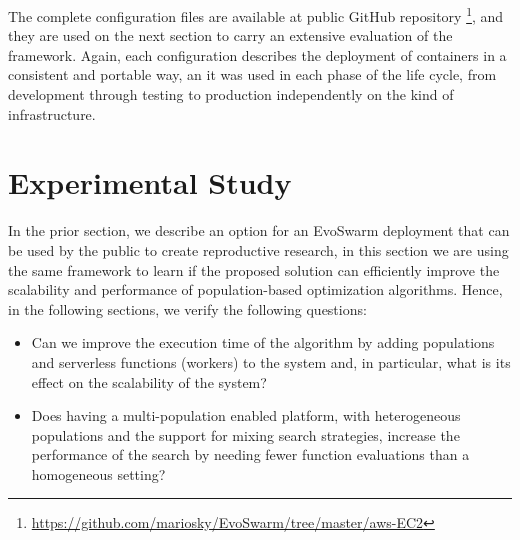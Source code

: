\documentclass[review]{elsarticle}
\begin{document}
The complete configuration files are available at public GitHub repository 
\footnote{\url{https://github.com/mariosky/EvoSwarm/tree/master/aws-EC2}}, and
they are used on the next section to carry an extensive evaluation of the framework.
Again, each configuration describes the deployment of containers in a consistent
and portable way, an it was used in each phase of the life cycle, from
development through testing to production independently on the kind of
infrastructure.


\section{Experimental Study} 
\label{setup} %


In the prior section, we describe an option for an EvoSwarm deployment that can be used by 
the public to create reproductive research, in this section we are
using the same framework to learn if the proposed solution can efficiently
improve the scalability and performance of population-based optimization
algorithms. %
Hence, in the following sections, we verify the following questions:

\begin{itemize}
\item Can we improve the execution time of the algorithm by adding populations
 and serverless functions (workers)  to the system and, in particular,
 what is its effect on the scalability of the system? %
 
\item Does having a multi-population enabled platform, with heterogeneous populations and
the support for mixing search strategies,  increase the performance of the
search by needing fewer function evaluations than a homogeneous setting? 

\end{itemize}
\end{document}
